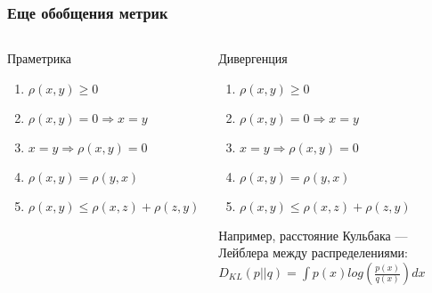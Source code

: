 \documentclass[10pt]{beamer}
\begin{document}
\begin{frame}
\frametitle{Еще обобщения метрик}


\begin{columns}[t] %

\begin{block}{Праметрика}
\begin{enumerate}
	\item $\rho(x, y) \geqslant 0$
	\item \sout{$\rho(x, y) = 0 \Rightarrow x = y$}
	\item $x = y \Rightarrow \rho(x, y) = 0$
	\item \sout{$\rho(x, y) = \rho(y, x)$}
	\item \sout{$\rho(x, y) \leqslant \rho(x, z) + \rho(z, y)$}
\end{enumerate}

\end{block} 

\begin{block}{Дивергенция}
\begin{enumerate}
	\item $\rho(x, y) \geqslant 0$
	\item $\rho(x, y) = 0 \Rightarrow x = y$
	\item $x = y \Rightarrow \rho(x, y) = 0$
	\item \sout{$\rho(x, y) = \rho(y, x)$}
	\item \sout{$\rho(x, y) \leqslant \rho(x, z) + \rho(z, y)$}
\end{enumerate}

\vspace{\baselineskip}
Например, расстояние Кульбака — Лейблера между распределениями:
$D_{KL}(p||q) = \int p(x)log(\frac{p(x)}{q(x)}) dx$
\end{block} 

\end{columns}

\end{frame}
\end{document}
